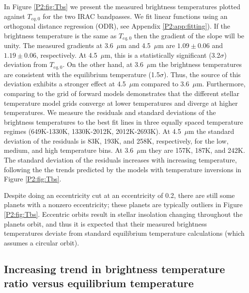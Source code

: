 In Figure \ref{P2:fig:Tbs} we present the measured brightness temperatures plotted against $T_{eq,\textit{0}}$ for the two IRAC bandpasses. We fit linear functions using an orthogonal distance regression (ODR), see Appendix \ref{P2:app:fitting}). If the brightness temperature is the same as $T_{eq,\textit{0}}$ then the gradient of the slope will be unity. The measured gradients at 3.6~$\mu$m and 4.5~$\mu$m are $1.09\pm0.06$ and $1.19\pm0.06$, respectively. At 4.5~$\mu$m, this is a statistically significant (3.2$\sigma$) deviation from $T_{eq,\textit{0}}$. On the other hand, at 3.6~$\mu$m the brightness temperatures are consistent with the equilibrium temperature (1.5$\sigma$). Thus, the source of this deviation  exhibits a stronger effect at 4.5~$\mu$m compared to 3.6~$\mu$m.
Furthermore, comparing to the grid of forward models demonstrates that the different stellar temperature model grids converge at lower temperatures and diverge at higher temperatures. We measure the residuals and standard deviations of the brightness temperatures to the best fit lines in three equally spaced temperature regimes (649K-1330K, 1330K-2012K, 2012K-2693K). At 4.5~$\mu$m the standard deviation of the residuals is 83K, 193K, and 258K, respectively,  for the low, medium, and high temperature bins. At 3.6~$\mu$m they are 157K, 187K, and 242K. The standard deviation of the residuals increases with increasing temperature, following the the trends predicted by the models with temperature inversions in Figure \ref{P2:fig:Tbs}.

Despite doing an eccentricity cut at an eccentricity of 0.2, there are still some planets with a nonzero eccentricity; these planets are typically outliers in Figure \ref{P2:fig:Tbs}. Eccentric orbits result in stellar insolation changing throughout the planets orbit, and thus it is expected that their measured brightness temperatures deviate from standard equilibrium temperature calculations (which assumes a circular orbit).

\subsection{Increasing trend in brightness temperature ratio versus equilibrium temperature}
\label{P2:sec:Tbratio}

